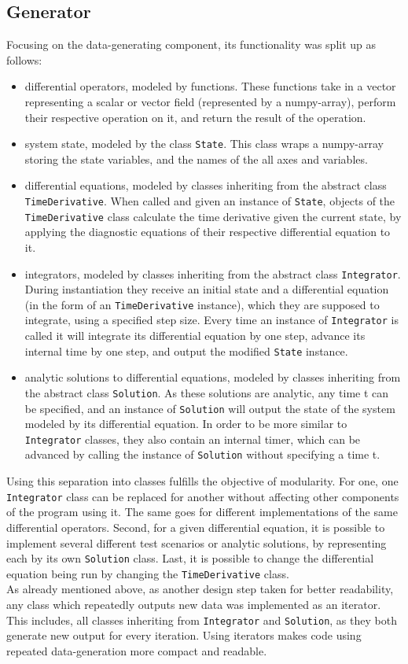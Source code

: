 \subsection*{Generator}
Focusing on the data-generating component, its functionality was split up as follows:
\begin{itemize}
\item differential operators, modeled by functions. 
These functions take in a vector representing a scalar or vector field (represented by a numpy-array), perform their respective operation on it, and return the result of the operation.
\item system state, modeled by the class \texttt{State}.
This class wraps a numpy-array storing the state variables, and the names of the all axes and variables.
\item differential equations, modeled by classes inheriting from the abstract class \texttt{TimeDerivative}.
When called and given an instance of \texttt{State}, objects of the \texttt{TimeDerivative} class calculate the time derivative given the current state, by applying the diagnostic equations of their respective differential equation to it.
\item integrators, modeled by classes inheriting from the abstract class \texttt{Integrator}.
During instantiation they receive an initial state and a differential equation (in the form of an \texttt{TimeDerivative} instance), which they are supposed to integrate, using a specified step size.
Every time an instance of \texttt{Integrator} is called it will integrate its differential equation by one step, advance its internal time by one step, and output the modified \texttt{State} instance.
\item analytic solutions to differential equations, modeled by classes inheriting from the abstract class \texttt{Solution}.
As these solutions are analytic, any time t can be specified, and an instance of \texttt{Solution} will output the state of the system modeled by its differential equation.
In order to be more similar to \texttt{Integrator} classes, they also contain an internal timer, which can be advanced by calling the instance of \texttt{Solution} without specifying a time t.
\end{itemize}
Using this separation into classes fulfills the objective of modularity.
For one, one \texttt{Integrator} class can be replaced for another without affecting other components of the program using it.
The same goes for different implementations of the same differential operators.
Second, for a given differential equation, it is possible to implement several different test scenarios or analytic solutions, by representing each by its own \texttt{Solution} class.
Last, it is possible to change the differential equation being run by changing the \texttt{TimeDerivative} class.
\\
As already mentioned above, as another design step taken for better readability, any class which repeatedly outputs new data was implemented as an iterator.
This includes, all classes inheriting from \texttt{Integrator} and \texttt{Solution}, as they both generate new output for every iteration.
Using iterators makes code using repeated data-generation more compact and readable.

